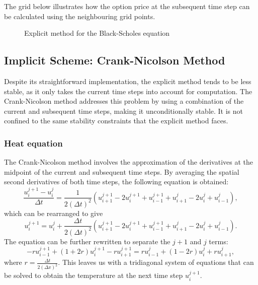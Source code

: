 The grid below illustrates how the option price at the subsequent time step can be calculated using the neighbouring grid points.


\begin{figure}[H]
    \centering
    \caption{Explicit method for the Black-Scholes equation}
    \label{fig:bse-explicit}
\end{figure}

\subsection{Implicit Scheme: Crank-Nicolson Method}
Despite its straightforward implementation, the explicit method tends to be less stable, as it only takes the current time steps into account for computation. The Crank-Nicolson method addresses this problem by using a combination of the current and subsequent time steps, making it unconditionally stable. It is not confined to the same stability constraints that the explicit method faces.

\subsubsection{Heat equation}
The Crank-Nicolson method involves the approximation of the derivatives at the midpoint of the current and subsequent time steps. By averaging the spatial
second derivatives of both time steps, the following equation is obtained:
\begin{equation}
    \frac{u_i^{j+1} - u_i^j}{\Delta t} = \frac{1}{2(\Delta t)^2} (u_{i+1}^{j+1} - 2u_i^{j+1} + u_{i-1}^{j+1} + u_{i+1}^j - 2u_i^j + u_{i-1}^j),
\end{equation}
which can be rearranged to give
\begin{equation}
    u_i^{j+1} = u_i^j + \frac{\Delta t}{2(\Delta t)^2} (u_{i+1}^{j+1} - 2u_i^{j+1} + u_{i-1}^{j+1} + u_{i+1}^j - 2u_i^j + u_{i-1}^j).
\end{equation}
The equation can be further rewritten to separate the $j+1$ and $j$ terms:
\begin{equation}
    -r u_{i-1}^{j+1} + (1 + 2r) u_i^{j+1} - r u_{i+1}^{j+1} = r u_{i-1}^j + (1 - 2r) u_i^j + r u_{i+1}^j,
\end{equation}
where $r = \frac{\Delta t}{2(\Delta x)^2}$. This leaves us with a tridiagonal system of equations that can be solved to obtain the temperature at the next time step $u_i^{j+1}$.

